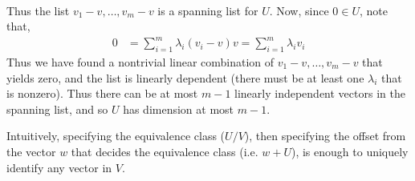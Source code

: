 \documentclass{book}
\begin{document}
\begin{enumerate}[label=\arabic*)]
\begin{enumerate}[label=\alph*)]
\begin{align*}
          \end{align*}
          Thus the list $v_1 - v, \dots, v_m - v$ is a spanning list for $U$. Now, since $0 \in U$, note that,
          \begin{align*}
            0 & = \sum_{i = 1}^{m}\lambda_i(v_i - v)
            v = \sum_{i = 1}^{m}\lambda_iv_i
          \end{align*}
          Thus we have found a nontrivial linear combination of $v_1 - v, \dots, v_m - v$ that yields zero, and the list is linearly dependent (there must be at least one
          $\lambda_i$ that is nonzero). Thus there can be at most $m - 1$ linearly independent vectors in the spanning list, and so $U$ has dimension at most $m - 1$. 
      \end{enumerate}
    \ii
      Intuitively, specifying the equivalence class ($U/V$), then specifying the offset from the vector $w$ that decides the equivalence class (i.e. $w + U$), is enough to uniquely identify
      any vector in $V$.


\end{enumerate}
\end{document}
